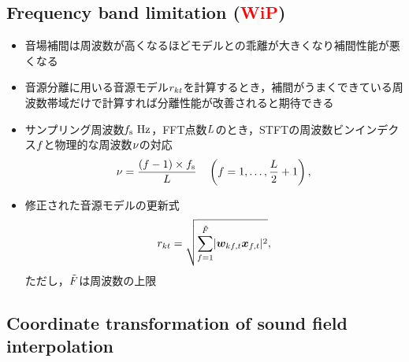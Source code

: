 \documentclass[twocolumn,9pt,dvipdfmx]{article}
\begin{document}


\subsection{Frequency band limitation (\textcolor{red}{\textbf{WiP}})}
\begin{itemize}
  \item 音場補間は周波数が高くなるほどモデルとの乖離が大きくなり補間性能が悪くなる \cite{Wakabayashi:2020:ASJ:A}
  \item 音源分離に用いる音源モデル$r _{kt}$を計算するとき，補間がうまくできている周波数帯域だけで計算すれば分離性能が改善されると期待できる
  \item サンプリング周波数$\freqSamp~\unit{\hertz}$，FFT点数$L$のとき，STFTの周波数ビンインデクス$f$と物理的な周波数$\nu$の対応
    \begin{equation}
      \nu = \frac{(f - 1)\times f _{\mathrm{s}}}{L} \quad \left(f = 1, \dots, \frac{L}{2} + 1\right),
    \end{equation}
  \item 修正された音源モデルの更新式
    \begin{equation}
      \var _{\src\tframe} = \sqrt{\sum _{\freq = 1} ^{\SubFreq} \lvert \demix _{\src\ft} \Obs _{\ft} \rvert ^2},
    \end{equation}
    ただし，$\tilde{F}$は周波数の上限
\end{itemize}

\subsection{Coordinate transformation of sound field interpolation}
\end{document}
